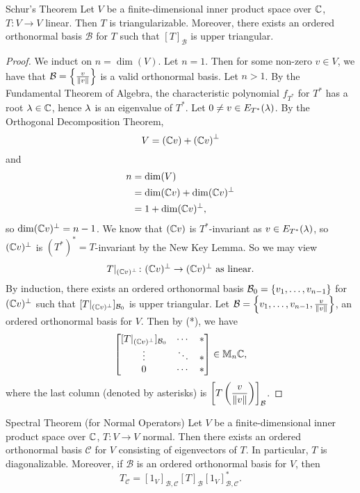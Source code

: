 \documentclass[class=article, crop=false]{standalone}
\begin{document}
  \newpage
  \begin{theorem}{Schur's Theorem}
    Let $V$ be a finite-dimensional inner product space over $\mathbb{C}$, $T\colon V\to V$ linear. Then $T$ is triangularizable. Moreover, there exists an ordered orthonormal basis $\mathcal{B}$ for $T$ such that $[T]_{\mathcal{B}}$ is upper triangular.
  \end{theorem}
  \begin{proof}
    We induct on $n = \dim(V)$. Let $n = 1$. Then for some non-zero $v\in V$, we have that $\mathcal{B} = \left\{\frac{v}{\left\lVert v\right\rVert}\right\}$ is a valid orthonormal basis. Let $n > 1$. By the Fundamental Theorem of Algebra, the characteristic polynomial $f_{T^*}$ for $T^*$ has a root $\lambda\in \mathbb{C}$, hence $\lambda$ is an eigenvalue of $T^*$. Let $0\neq v\in E_{T^*}(\lambda)$. By the Orthogonal Decomposition Theorem, 
    \[
      V = (\mathbb{C} v) + \left( \mathbb{C} v \right)^\perp
    \]
    and
    \begin{align*}
      n &= \dim(V) \\
        &= \dim(\mathbb{C} v) + \dim(\mathbb{C} v)^\perp \\
        &= 1 + \dim(\mathbb{C} v)^\perp,
    \end{align*}
    so $\dim(\mathbb{C} v)^\perp = n - 1$. We know that $(\mathbb{C} v)$ is $T^*$-invariant as $v\in E_{T^*}(\lambda)$, so $(\mathbb{C} v)^\perp$ is $(T^*)^* = T$-invariant by the New Key Lemma. So we may view
    \[
      T|_{(\mathbb{C} v)^\perp}\colon (\mathbb{C} v)^\perp\to (\mathbb{C} v)^\perp \text{ as linear.}
    \]
    By induction, there exists an ordered orthonormal basis $\mathcal{B}_0 = \left\{v_1,\dotsc,v_{n-1}\right\}$ for $(\mathbb{C} v)^\perp$ such that $[T|_{(\mathbb{C} v)^\perp}]_{\mathcal{B}_0}$ is upper triangular. Let $\mathcal{B} = \left\{v_1,\dotsc,v_{n-1}, \frac{v}{\left\lVert v\right\rVert}\right\}$, an ordered orthonormal basis for $V$. Then by (*), we have
    \[
      \begin{bmatrix}
        [T|_{(\mathbb{C} v)^\perp}]_{\mathcal{B}_0} & \cdots & * \\
        \vdots & \ddots & * \\
        0 & \cdots & *
      \end{bmatrix} \in \mathbb{M}_n\mathbb{C},
    \]
    where the last column (denoted by asterisks) is $\left[T \left( \dfrac{v}{\left\lVert v\right\rVert} \right)\right]_{\mathcal{B}}$.
  \end{proof}
  \newpage
  \begin{theorem}{Spectral Theorem (for Normal Operators)}
    Let $V$ be a finite-dimensional inner product space over $\mathbb{C}$, $T\colon V\to V$ normal. Then there exists an ordered orthonormal basis $\mathcal{C}$ for $V$ consisting of eigenvectors of $T$. In particular, $T$ is diagonalizable. Moreover, if $\mathcal{B}$ is an ordered orthonormal basis for $V$, then
    \[
      T_{\mathcal{C}} = [1_V]_{\mathcal{B},\mathcal{C}}[T]_{\mathcal{B}}[1_V]_{\mathcal{B},\mathcal{C}}^*.
    \]
  \end{theorem}
\end{document}
